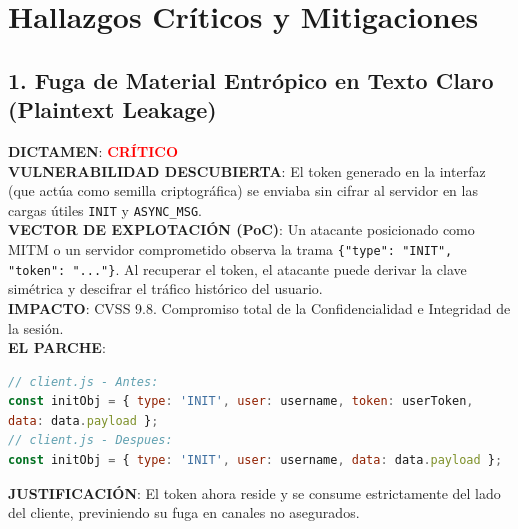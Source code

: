 \documentclass[12pt,a4paper]{article}
\begin{document}
\section{Hallazgos Críticos y Mitigaciones}

\subsection{1. Fuga de Material Entrópico en Texto Claro (Plaintext Leakage)}
\textbf{DICTAMEN}: \textcolor{red}{\textbf{CRÍTICO}}\\
\textbf{VULNERABILIDAD DESCUBIERTA}: El token generado en la interfaz (que actúa como semilla criptográfica) se enviaba sin cifrar al servidor en las cargas útiles \texttt{INIT} y \texttt{ASYNC\_MSG}. \\
\textbf{VECTOR DE EXPLOTACIÓN (PoC)}: Un atacante posicionado como MITM o un servidor comprometido observa la trama \texttt{\{"type": "INIT", "token": "..."\}}. Al recuperar el token, el atacante puede derivar la clave simétrica y descifrar el tráfico histórico del usuario.\\
\textbf{IMPACTO}: CVSS 9.8. Compromiso total de la Confidencialidad e Integridad de la sesión.\\
\textbf{EL PARCHE}:
\begin{lstlisting}[language=JavaScript]
// client.js - Antes:
const initObj = { type: 'INIT', user: username, token: userToken,
data: data.payload };
// client.js - Despues:
const initObj = { type: 'INIT', user: username, data: data.payload };
\end{lstlisting}
\textbf{JUSTIFICACIÓN}: El token ahora reside y se consume estrictamente del lado del cliente, previniendo su fuga en canales no asegurados.
\end{document}
